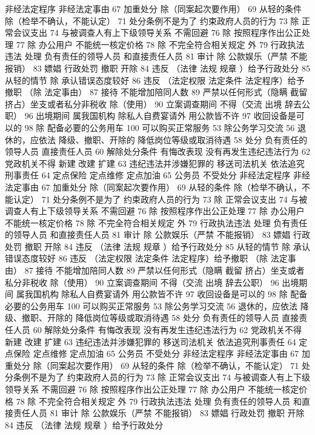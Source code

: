 \documentclass[cyan]{elegantnote}
\begin{document}
非经法定程序
非经法定事由
67 加重处分
除（同案起次要作用）
69 从轻的条件
除（检举不确认，不能认定）
71 处分条例不是为了
约束政府人员的行为
73 除 正常会议支出
74 与被调查人有上下级领导关系 不需回避
76 除 按照程序作出公正处理
77 除 办公用户
不能统一核定价格
78 除 不完全符合相关规定 外
79 行政执法违法 处理
负有责任的领导人员
和直接责任人员
81 审计
除 公款娱乐（严禁 不能报销）
83 嫖娼 行政处罚
撤职 开除
84 违反 （法律 法规 规章 ）给予行政处分
85 从轻的情节
除 承认错误态度较好
86 违反 （法定权限 法定条件 法定程序）给予撤职
（除 法定事由）
87 接待 不能增加陪同人数
89 严禁以任何形式（隐瞒 截留 挤占）坐支或者私分非税收
除（使用）
90 立案调查期间 不得（交流 出境 辞去公职）
96 出境期间 属我国机构 除私人自费宴请外 用公款皆不许
97 收回设备是可以的
98 除 配备必要的公务用车
100 可以购买正常服务
53 除公务学习交流
56 退休的，应依法
降级、撤职、开除的 降低岗位等级或取消待遇
58 处分
负有责任的领导人员
直接责任人员
60 解除处分条件
有悔改表现
没有再发生违纪违法行为
62 党政机关不得
新建 改建 扩建
63 违纪违法并涉嫌犯罪的
移送司法机关
依法追究刑事责任
64 定点保险 定点维修 定点加油
65 公务员 不受处分
非经法定程序
非经法定事由
67 加重处分
除（同案起次要作用）
69 从轻的条件
除（检举不确认，不能认定）
71 处分条例不是为了
约束政府人员的行为
73 除 正常会议支出
74 与被调查人有上下级领导关系 不需回避
76 除 按照程序作出公正处理
77 除 办公用户
不能统一核定价格
78 除 不完全符合相关规定 外
79 行政执法违法 处理
负有责任的领导人员
和直接责任人员
81 审计
除 公款娱乐（严禁 不能报销）
83 嫖娼 行政处罚
撤职 开除
84 违反 （法律 法规 规章 ）给予行政处分
85 从轻的情节
除 承认错误态度较好
86 违反 （法定权限 法定条件 法定程序）给予撤职
（除 法定事由）
87 接待 不能增加陪同人数
89 严禁以任何形式（隐瞒 截留 挤占）坐支或者私分非税收
除（使用）
90 立案调查期间 不得（交流 出境 辞去公职）
96 出境期间 属我国机构 除私人自费宴请外 用公款皆不许
97 收回设备是可以的
98 除 配备必要的公务用车
100 可以购买正常服务
53 除公务学习交流
56 退休的，应依法
降级、撤职、开除的 降低岗位等级或取消待遇
58 处分
负有责任的领导人员
直接责任人员
60 解除处分条件
有悔改表现
没有再发生违纪违法行为
62 党政机关不得
新建 改建 扩建
63 违纪违法并涉嫌犯罪的
移送司法机关
依法追究刑事责任
64 定点保险 定点维修 定点加油
65 公务员 不受处分
非经法定程序
非经法定事由
67 加重处分
除（同案起次要作用）
69 从轻的条件
除（检举不确认，不能认定）
71 处分条例不是为了
约束政府人员的行为
73 除 正常会议支出
74 与被调查人有上下级领导关系 不需回避
76 除 按照程序作出公正处理
77 除 办公用户
不能统一核定价格
78 除 不完全符合相关规定 外
79 行政执法违法 处理
负有责任的领导人员
和直接责任人员
81 审计
除 公款娱乐（严禁 不能报销）
83 嫖娼 行政处罚
撤职 开除
84 违反 （法律 法规 规章 ）给予行政处分
\end{document}
